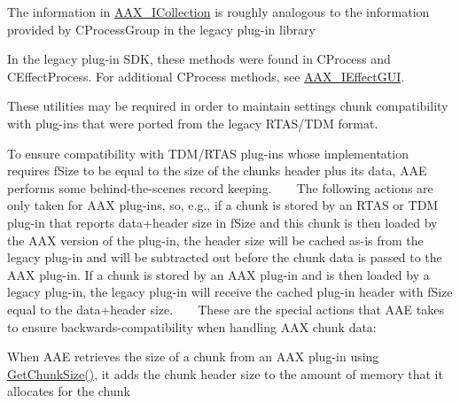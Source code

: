 \begin{DoxyRefList}
\item[Class \mbox{\hyperlink{a02065}{AAX\+\_\+\+ICollection}} ]\label{a00802__porting_notes000037}%
%
 The information in \mbox{\hyperlink{a02065}{AAX\+\_\+\+ICollection}} is roughly analogous to the information provided by CProcess\+Group in the legacy plug-\/in library 
\item[Class \mbox{\hyperlink{a02113}{AAX\+\_\+\+IEffect\+Parameters}} ]\label{a00802__porting_notes000038}%
%
 In the legacy plug-\/in SDK, these methods were found in CProcess and {\ttfamily CEffect\+Process}. For additional {\ttfamily CProcess} methods, see \mbox{\hyperlink{a02109}{AAX\+\_\+\+IEffect\+GUI}}. 
\item[File \mbox{\hyperlink{a00686}{AAX\+\_\+\+Slider\+Conversions.h}} ]\label{a00802__porting_notes000059}%
%
 These utilities may be required in order to maintain settings chunk compatibility with plug-\/ins that were ported from the legacy RTAS/\+TDM format. 
\item[Class \mbox{\hyperlink{a01697}{AAX\+\_\+\+SPlug\+In\+Chunk\+Header}} ]\label{a00802__porting_notes000002}%
%
 To ensure compatibility with TDM/\+RTAS plug-\/ins whose implementation requires {\ttfamily f\+Size} to be equal to the size of the chunk\textquotesingle{}s header plus its data, AAE performs some behind-\/the-\/scenes record keeping. ~\newline
 ~\newline
 The following actions are only taken for AAX plug-\/ins, so, e.\+g., if a chunk is stored by an RTAS or TDM plug-\/in that reports data+header size in {\ttfamily f\+Size} and this chunk is then loaded by the AAX version of the plug-\/in, the header size will be cached as-\/is from the legacy plug-\/in and will be subtracted out before the chunk data is passed to the AAX plug-\/in. If a chunk is stored by an AAX plug-\/in and is then loaded by a legacy plug-\/in, the legacy plug-\/in will receive the cached plug-\/in header with {\ttfamily f\+Size} equal to the data+header size. ~\newline
 ~\newline
 These are the special actions that AAE takes to ensure backwards-\/compatibility when handling AAX chunk data\+:
\begin{DoxyItemize}
\item When AAE retrieves the size of a chunk from an AAX plug-\/in using \mbox{\hyperlink{a01953_aa986711cd372febcaae803e86ae08f63}{Get\+Chunk\+Size()}}, it adds the chunk header size to the amount of memory that it allocates for the chunk ~\newline


\end{DoxyItemize}
\end{DoxyRefList}
